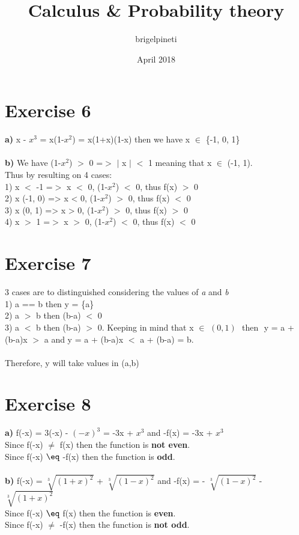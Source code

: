 \documentclass{article}
\title{Calculus & Probability theory}
\author{brigelpineti }
\date{April 2018}
\begin{document}
  \maketitle
  \section*{Exercise 6}
  
  
  \textbf{a)} x - $x^3$ = x(1-$x^2$) = x(1+x)(1-x) then we have x $\in$ \{-1, 0, 1\} \\ \\
  \textbf{b)} We have (1-$x^2$) $>$ 0 =$>$ $\vert$ x $\vert$ $<$ 1 meaning that x $\in$ (-1, 1). \\ 
  Thus by resulting on 4 cases: \\
  1) x $<$ -1 =$>$ x $<$ 0, (1-$x^2$) $<$ 0, thus f(x) $>$ 0 \\
  2) x \in (-1, 0) => x < 0, (1-$x^2$) $>$ 0, thus f(x) $<$ 0 \\
  3) x \in (0, 1) => x > 0, (1-$x^2$) $>$ 0, thus f(x) $>$ 0 \\
  4) x $>$ 1 =$>$ x $>$ 0, (1-$x^2$) $<$ 0, thus f(x) $<$ 0
  
  
  \section*{Exercise 7}
  
  3 cases are to distinguished considering the values of \textit{a} and \textit{b} \\
  1) a == b then y = \{a\} \\
  2) a $>$ b then (b-a) $<$ 0 \\
  3) a $<$ b then (b-a) $>$ 0. Keeping in mind that x $\in$ $(0,1)$ $ $ then $ $ y = a + (b-a)x $>$ a and y = a + (b-a)x $<$ a + (b-a) = b.\\ \\
  Therefore, y will take values in (a,b) \\ 
  
  \section*{Exercise 8}
  
  \textbf{a)} f(-x) = 3(-x) - $(-x)^3$ = -3x + $x^3$ and -f(x) = -3x + $x^3$ \\
  Since f(-x) $\neq$ f(x) then the function is \textbf{not even}. \\
  Since f(-x) $\eq$ -f(x) then the function is \textbf{odd}. \\ \\
  \textbf{b)} f(-x) = $\sqrt[3]{(1+x)^2}$ + $\sqrt[3]{(1-x)^2}$ and -f(x) = - $\sqrt[3]{(1-x)^2}$ - $\sqrt[3]{(1+x)^2}$ \\
  Since f(-x) $\eq$ f(x) then the function is \textbf{even}. \\
  Since f(-x) $\neq$ -f(x) then the function is \textbf{not odd}.
  
\end{document}
